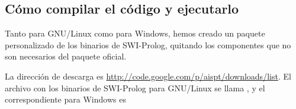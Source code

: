 \subsection{Cómo compilar el código y ejecutarlo}

Tanto para GNU/Linux como para Windows, hemos creado un paquete personalizado
de los binarios de SWI-Prolog, quitando los componentes que no son necesarios
del paquete oficial.

La dirección de descarga es
\href{http://code.google.com/p/aispt/downloads/list}{http://code.google.com/p/aispt/downloads/list}.
El archivo con los binarios de SWI-Prolog para
GNU/Linux se llama \linebreak{}, y el
correspondiente para Windows es \linebreak{}

